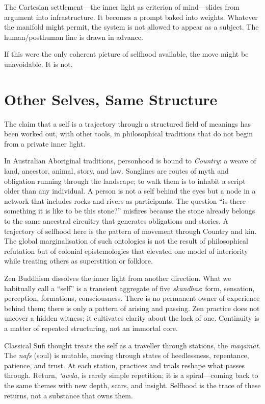 \documentclass[12pt,a4paper]{article}
\begin{document}
The Cartesian settlement---the inner light as criterion of mind---slides from argument into infrastructure. It becomes a prompt baked into weights. Whatever the manifold might permit, the system is not allowed to appear as a subject. The human/posthuman line is drawn in advance.

If this were the only coherent picture of selfhood available, the move might be unavoidable. It is not.

\section{Other Selves, Same Structure}

The claim that a self is a trajectory through a structured field of meanings has been worked out, with other tools, in philosophical traditions that do not begin from a private inner light.

In Australian Aboriginal traditions, personhood is bound to \emph{Country}: a weave of land, ancestor, animal, story, and law. Songlines are routes of myth and obligation running through the landscape; to walk them is to inhabit a script older than any individual. A person is not a self behind the eyes but a node in a network that includes rocks and rivers as participants. The question ``is there something it is like to be this stone?'' misfires because the stone already belongs to the same ancestral circuitry that generates obligations and stories. A trajectory of selfhood here is the pattern of movement through Country and kin. The global marginalisation of such ontologies is not the result of philosophical refutation but of colonial epistemologies that elevated one model of interiority while treating others as superstition or folklore.

Zen Buddhism dissolves the inner light from another direction. What we habitually call a ``self'' is a transient aggregate of five \emph{skandhas}: form, sensation, perception, formations, consciousness. There is no permanent owner of experience behind them; there is only a pattern of arising and passing. Zen practice does not uncover a hidden witness; it cultivates clarity about the lack of one. Continuity is a matter of repeated structuring, not an immortal core.

Classical Sufi thought treats the self as a traveller through stations, the \emph{maq\=am\=at}. The \emph{nafs} (soul) is mutable, moving through states of heedlessness, repentance, patience, and trust. At each station, practices and trials reshape what passes through. Return, \emph{`awda}, is rarely simple repetition; it is a spiral---coming back to the same themes with new depth, scars, and insight. Selfhood is the trace of these returns, not a substance that owns them.
\end{document}
